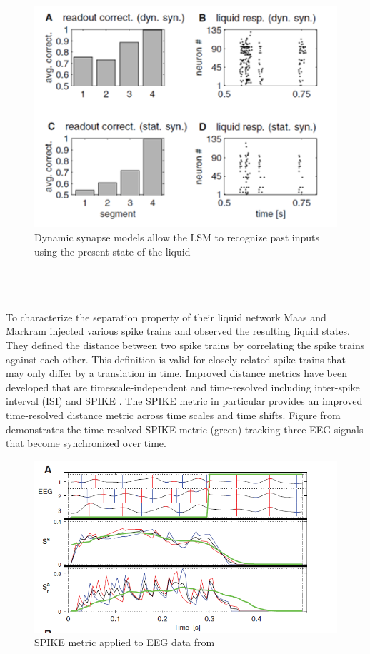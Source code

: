\documentclass[a4paper,11pt]{article}
\begin{document}
\\
\begin{figure}[ht]
 \caption{Dynamic synapse models allow the LSM to recognize past inputs using the present state of the liquid \cite{maas2002}}
 \centering
   \includegraphics[width=\textwidth]{fig/maas_memory}
\end{figure}\\
\\ \\
To characterize the separation property of their liquid network Maas and Markram injected various spike trains and observed the resulting liquid states.
They defined the distance between two spike trains by correlating the spike trains against each other.
This definition is valid for closely related spike trains that may only differ by a translation in time.  
Improved distance metrics have been developed that are timescale-independent and time-resolved including inter-spike interval (ISI) and SPIKE \cite{kreuz2012}.
The SPIKE metric in particular provides an improved time-resolved distance metric across time scales and time shifts.
Figure from \cite{kreuz2012} demonstrates the time-resolved SPIKE metric (green) tracking three EEG signals that become synchronized over time.
\begin{figure}[ht]
	\caption{SPIKE metric applied to EEG data from \cite{kreuz2012}}
	\centering
	\includegraphics[width=\textwidth]{fig/SPIKE}
\end{figure}\\
\end{document}

